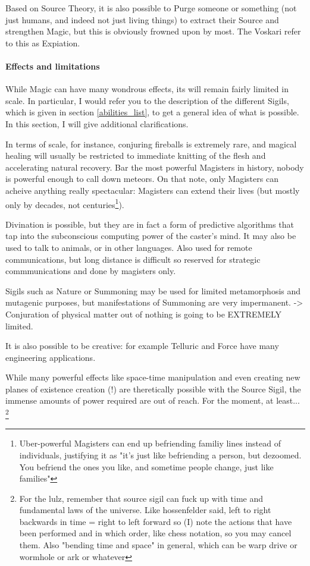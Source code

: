 Based on Source Theory, it is also possible to Purge someone or something (not just humans, and indeed not just living things) to extract their Source and strengthen Magic, but this is obviously frowned upon by most. The Voskari refer to this as Expiation.


\paragraph{Effects and limitations}

\label{magic_effects}

While Magic can have many wondrous effects, its will remain fairly limited in scale. In particular, I would refer you to the description of the different Sigils, which is given in section \ref{abilities_list}, to get a general idea of what is possible. In this section, I will give additional clarifications.

In terms of scale, for instance, conjuring fireballs is extremely rare, and magical healing will usually be restricted to immediate knitting of the flesh and accelerating natural recovery. Bar the most powerful Magisters in history, nobody is powerful enough to call down meteors. On that note, only Magisters can acheive anything really spectacular: Magisters can extend their lives (but mostly only by decades, not centuries\footnote{Uber-powerful Magisters can end up befriending familiy lines instead of individuals, justifying it as "it's just like befriending a person, but dezoomed. You befriend the ones you like, and sometime people change, just like families"}).

Divination is possible, but they are in fact a form of predictive algorithms that tap into the subconscious computing power of the caster's mind. It may also be used to talk to animals, or in other languages. Also used for remote communications, but long distance is difficult so reserved for strategic commmunications and done by magisters only.

Sigils such as Nature or Summoning may be used for limited  metamorphosis and mutagenic purposes, but manifestations of Summoning are very impermanent. -> Conjuration of physical matter out of nothing is going to be EXTREMELY limited. 

It is also possible to be creative: for example Telluric and Force have many engineering applications.

While many powerful effects like space-time manipulation and even creating new planes of existence creation (!) are theretically possible with the Source Sigil, the immense amounts of power required are out of reach. For the moment, at least...
 \footnote{For the lulz, remember that source sigil can fuck up with time and fundamental laws of the universe. Like hossenfelder said, left to right backwards in time = right to left forward so (I) note the actions that have been performed and in which order, like chess notation, so you may cancel them. Also "bending time and space" in general, which can be warp drive or wormhole or ark or whatever}



